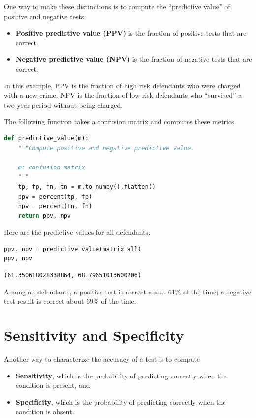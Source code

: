One way to make these distinctions is to compute the ``predictive
value'' of positive and negative tests.

\begin{itemize}
\item
  \textbf{Positive predictive value (PPV)} is the fraction of positive
  tests that are correct.
\item
  \textbf{Negative predictive value (NPV)} is the fraction of negative
  tests that are correct.
\end{itemize}

In this example, PPV is the fraction of high risk defendants who were
charged with a new crime. NPV is the fraction of low risk defendants who
``survived'' a two year period without being charged.

The following function takes a confusion matrix and computes these
metrics.

\begin{lstlisting}[language=Python,style=source]
def predictive_value(m):
    """Compute positive and negative predictive value.
    
    m: confusion matrix
    """
    tp, fp, fn, tn = m.to_numpy().flatten()
    ppv = percent(tp, fp)
    npv = percent(tn, fn)
    return ppv, npv
\end{lstlisting}

Here are the predictive values for all defendants.

\begin{lstlisting}[language=Python,style=source]
ppv, npv = predictive_value(matrix_all)
ppv, npv
\end{lstlisting}

\begin{lstlisting}[style=output]
(61.350618028338864, 68.79651013600206)
\end{lstlisting}

Among all defendants, a positive test is correct about 61\% of the time;
a negative test result is correct about 69\% of the time.

\hypertarget{sensitivity-and-specificity}{%
\section{Sensitivity and
Specificity}\label{sensitivity-and-specificity}}

Another way to characterize the accuracy of a test is to compute

\begin{itemize}
\item
  \textbf{Sensitivity}, which is the probability of predicting correctly
  when the condition is present, and
\item
  \textbf{Specificity}, which is the probability of predicting correctly
  when the condition is absent.
\end{itemize}

